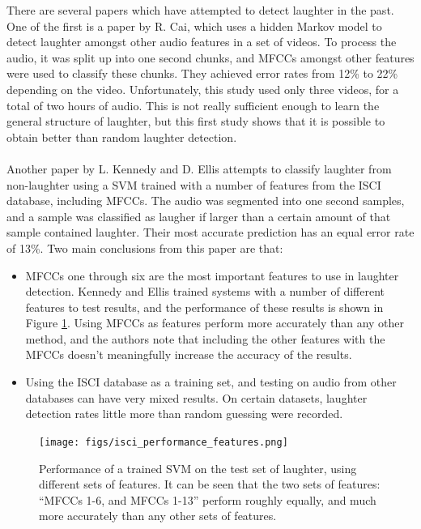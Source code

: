 \documentclass[a4paper,11pt,notitlepage]{article}
\begin{document}
There are several papers which have attempted to detect laughter in the past. One of the first is a paper by R. Cai\cite{cai2003highlight}, which uses a hidden Markov model to detect laughter amongst other audio features in a set of videos. To process the audio, it was split up into one second chunks, and MFCCs amongst other features were used to classify these chunks. They achieved error rates from 12\% to 22\% depending on the video. Unfortunately, this study used only three videos, for a total of two hours of audio. This is not really sufficient enough to learn the general structure of laughter, but this first study shows that it is possible to obtain better than random laughter detection.\\
\\
Another paper by L. Kennedy and D. Ellis\cite{kennedy2004laughter} attempts to classify laughter from non-laughter using a SVM trained with a number of features from the ISCI database, including MFCCs. The audio was segmented into one second samples, and a sample was classified as laugher if larger than a certain amount of that sample contained laughter. Their most accurate prediction has an equal error rate of 13\%. Two main conclusions from this paper are that:
\begin{itemize}
\item MFCCs one through six are the most important features to use in laughter detection. Kennedy and Ellis trained systems with a number of different features to test results, and the performance of these results is shown in Figure \ref{isci_performance_features}. Using MFCCs as features perform more accurately than any other method, and the authors note that including the other features with the MFCCs doesn't meaningfully increase the accuracy of the results.
\item Using the ISCI database as a training set, and testing on audio from other databases can have very mixed results. On certain datasets, laughter detection rates little more than random guessing were recorded.
\end{itemize}
\begin{figure}[H]
	\centering
	\texttt{[image: figs/isci\_performance\_features.png]}
	\caption{Performance of a trained SVM on the test set of laughter, using different sets of features. It can be seen that the two sets of features: ``MFCCs 1-6, and MFCCs 1-13'' perform roughly equally, and much more accurately than any other sets of features.}
	\label{isci_performance_features}
\end{figure}
\end{document}
